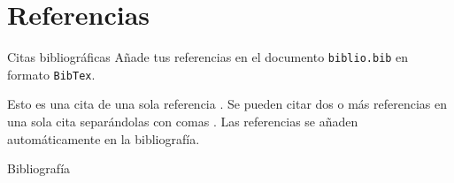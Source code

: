\documentclass{beamer}
\begin{document}
\section{Referencias}

\begin{frame}{Citas bibliográficas}
    Añade tus referencias en el documento \texttt{biblio.bib} en formato \texttt{BibTex}.

    Esto es una cita de una sola referencia \cite{zhang2017digital}.
    Se pueden citar dos o más referencias en una sola cita separándolas con comas \cite{praks2018advanced,santos2018online}.
    Las referencias se añaden automáticamente en la bibliografía.
\end{frame}

\begin{frame}[allowframebreaks]{Bibliografía}


\end{frame}



\begin{frame}
    \maketitle
\end{frame}
\end{document}

